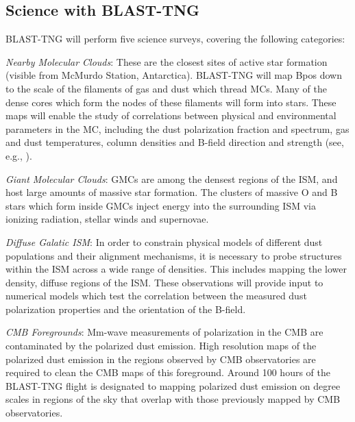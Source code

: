 \subsection{Science with BLAST-TNG}

BLAST-TNG will perform five science surveys, covering the following categories:

\vspace{5mm}

\textit{Nearby Molecular Clouds}: These are the closest sites of active star formation (visible from McMurdo Station, Antarctica). BLAST-TNG will map \gls{Bpos} down to the scale of the filaments of gas and dust which thread MCs. Many of the dense cores which form the nodes of these filaments will form into stars. These maps will enable the study of correlations between physical and environmental parameters in the MC, including the dust polarization fraction and spectrum, gas and dust temperatures, column densities and B-field direction and strength (see, e.g., \citet{galitzki2014balloon,fissel2016balloon,fissel2018relative,shariff2019submillimeter,gandilo2016submillimeter}).

\vspace{5mm}

\textit{Giant Molecular Clouds}: GMCs are among the densest regions of the ISM, and host large amounts of massive star formation. The clusters of massive O and B stars which form inside GMCs inject energy into the surrounding ISM via ionizing radiation, stellar winds and supernovae.
\vspace{5mm}

\textit{Diffuse Galatic ISM}: In order to constrain physical models of different dust populations and their alignment mechanisms, it is necessary to probe structures within the ISM across a wide range of densities. This includes mapping the lower density, diffuse regions of the ISM\@. These observations will provide input to numerical models which test the correlation between the measured dust polarization properties and the orientation of the B-field.

\vspace{5mm}

\textit{CMB Foregrounds}: Mm-wave measurements of polarization in the CMB are contaminated by the polarized dust emission. High resolution maps of the polarized dust emission in the regions observed by CMB observatories are required to clean the CMB maps of this foreground. Around 100 hours of the BLAST-TNG flight is designated to mapping polarized dust emission on degree scales in regions of the sky that overlap with those previously mapped by CMB observatories.

